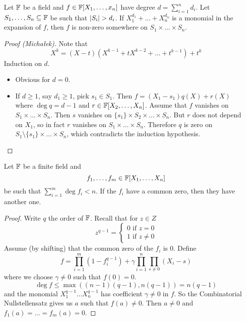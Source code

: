 \documentclass{article}
\begin{document}
\begin{nthm}
  Let $\mathbb F$ be a field and $f \in \mathbb F[X_1, \dots, x_n]$ have degree $d = \sum_{i = 1}^n d_i$. Let $S_1, \dots, S_n \subseteq \mathbb F$ be such that $\left\lvert S_i\right\rvert > d_i$. If $X_1^{d_1} + \dots + X_n^{d_n}$ is a monomial in the expansion of $f$, then $f$ is non-zero somewhere on $S_1 \times \dots \times S_n$.
\end{nthm}
\begin{proof}[Proof (Michałek)]
  Note that
  $$X^k = (X - t)(X^{k - 1} + tX^{k - 2} + \dots + t^{k - 1}) + t^k$$
  Induction on $d$.
  \begin{itemize}
    \item Obvious for $d = 0$.
    \item If $d \ge 1$, say $d_1 \ge 1$, pick $s_1 \in S_1$. Then $f = (X_1 - s_1)q(X) + r(X)$ where $\deg q = d - 1$ and $r \in \mathbb F[X_2, \dots, X_n]$. Assume that $f$ vanishes on $S_1 \times \dots \times S_n$. Then $s$ vanishes on $\{s_1\} \times S_2 \times \dots \times S_n$. But $r$ does not depend on $X_1$, so in fact $r$ vanishes on $S_1 \times \dots \times S_n$. Therefore $q$ is zero on $S_1 \setminus \{s_1\} \times \dots \times S_n$, which contradicts the induction hypothesis.
  \end{itemize}
\end{proof}

\begin{nthm}
  Let $\mathbb F$ be a finite field and
  $$f_1, \dots, f_m \in \mathbb F[X_1, \dots, X_n]$$
  be such that $\sum_{i = 1}^m \deg f_i < n$. If the $f_i$ have a common zero, then they have another one.
\end{nthm}
\begin{proof}
  Write $q$ the order of $\mathbb F$. Recall that for $z \in Z$
  $$z^{q - 1} = \begin{cases*}
    0 \text{ if } z = 0 \\
    1 \text{ if } z \ne 0
  \end{cases*}$$
  Assume (by shifting) that the common zero of the $f_i$ is $0$. Define
  $$f = \prod_{i = 1}^m (1 - f_i^{q - 1}) + \gamma \prod_{i = 1}^n \prod_{s \ne 0} (X_i - s)$$
  where we choose $\gamma \ne 0$ such that $f(0) = 0$.
  $$\deg f \le \max((n - 1)(q - 1), n(q - 1)) = n(q - 1)$$
  and the monomial $X_1^{q - 1} \dots X_n^{q - 1}$ has coefficient $\gamma \ne 0$ in $f$. So the Combinatorial Nullstellensatz gives us $a$ such that $f(a) \ne 0$. Then $a \ne 0$ and $f_1(a) = \dots = f_m(a) = 0$.
\end{proof}
\end{document}
